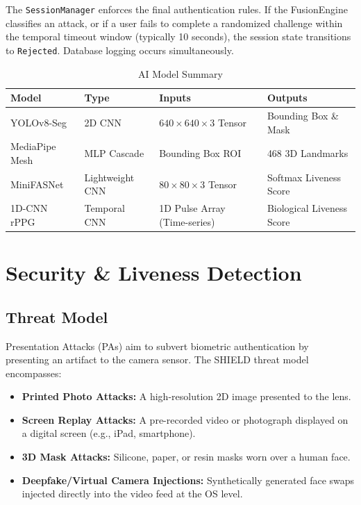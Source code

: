 \documentclass[12pt, a4paper]{report}
\begin{document}
\vspace{1em}
The \texttt{SessionManager} enforces the final authentication rules. If the FusionEngine classifies an attack, or if a user fails to complete a randomized challenge within the temporal timeout window (typically 10 seconds), the session state transitions to \texttt{Rejected}. Database logging occurs simultaneously.

\begin{table}[H]
\centering
\caption{AI Model Summary}
\begin{tabularx}{\textwidth}{|l|l|X|X|}
\hline
\textbf{Model} & \textbf{Type} & \textbf{Inputs} & \textbf{Outputs} \\
\hline
YOLOv8-Seg & 2D CNN & $640\times640\times3$ Tensor & Bounding Box \& Mask \\
MediaPipe Mesh & MLP Cascade & Bounding Box ROI & 468 3D Landmarks \\
MiniFASNet & Lightweight CNN & $80\times80\times3$ Tensor & Softmax Liveness Score \\
1D-CNN rPPG & Temporal CNN & 1D Pulse Array (Time-series) & Biological Liveness Score \\
\hline
\end{tabularx}
\end{table}
\chapter{Security \& Liveness Detection}

\section{Threat Model}
Presentation Attacks (PAs) aim to subvert biometric authentication by presenting an artifact to the camera sensor. The SHIELD threat model encompasses:
\begin{itemize}
    \item \textbf{Printed Photo Attacks:} A high-resolution 2D image presented to the lens.
    \item \textbf{Screen Replay Attacks:} A pre-recorded video or photograph displayed on a digital screen (e.g., iPad, smartphone).
    \item \textbf{3D Mask Attacks:} Silicone, paper, or resin masks worn over a human face.
    \item \textbf{Deepfake/Virtual Camera Injections:} Synthetically generated face swaps injected directly into the video feed at the OS level.
\end{itemize}
\end{document}

